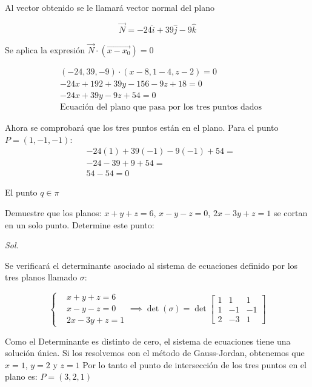 Al vector obtenido se le llamará vector normal del plano

\begin{equation*}
	\overrightarrow{N}=-24\hat{i}+39\hat{j}-9\hat{k}
\end{equation*}

Se aplica la expresión $\overrightarrow{N}\cdot \left(\overrightarrow{x-x_0}\right)=0$

\begin{align*}
	 & (-24,39,-9)\cdot (x-8,1-4,z-2)=0                             \\
	 & -24x+192+39y-156-9z+18=0                                     \\
	 & -24x+39y-9z+54=0                                             \\
	 & \text{Ecuación del plano que pasa por los tres puntos dados}
\end{align*}

Ahora se comprobará que los tres puntos están en el plano.
Para el punto $P=(1,-1,-1)$:
\begin{align*}
	 & -24(1)+39(-1)-9(-1)+54= \\
	 & -24-39+9+54=            \\
	 & 54-54=0
\end{align*}

El punto $q\in \pi$

\begin{example}
	Demuestre que los planos: $x+y+z=6$, $x-y-z=0$, $2x-3y+z=1$ se cortan en un solo punto. Determine este punto:
\end{example}

\textit{ Sol. }

Se verificará el determinante asociado al sistema de ecuaciones definido por los tres planos llamado $\sigma$:

\begin{equation*}
	\begin{cases}
		 & x+y+z  =6 \\
		 & x-y-z  =0 \\
		 & 2x-3y+z=1
	\end{cases}\implies\det\left(\sigma\right)=\det\begin{bmatrix}
		1 & 1 & 1 \\1&-1&-1\\2&-3&1
	\end{bmatrix}
\end{equation*}

Como el Determinante es distinto de cero, el sistema de ecuaciones tiene una solución única.
Si los resolvemos con el método de Gauss-Jordan, obtenemos que $x=1$, $y=2$ y $z=1$
Por lo tanto el punto de intersección de los tres puntos en el plano es: $P=(3,2,1)$

